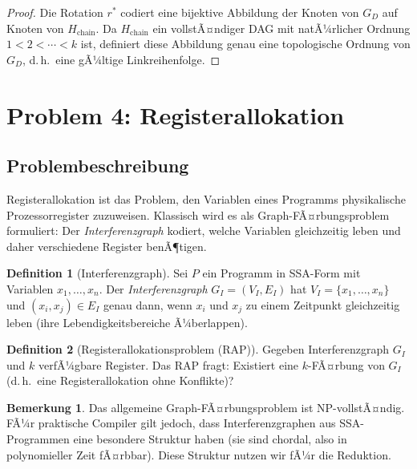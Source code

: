 ﻿\documentclass[a4paper,12pt]{article}
\theoremstyle{definition}
\newtheorem{definition}{Definition}
\newtheorem{bemerkung}{Bemerkung}
\begin{document}
\begin{proof}
Die Rotation $r^*$ codiert eine bijektive Abbildung der Knoten von $G_D$ auf Knoten von $H_{\text{chain}}$. Da $H_{\text{chain}}$ ein vollstÃ¤ndiger DAG mit natÃ¼rlicher Ordnung $1 < 2 < \cdots < k$ ist, definiert diese Abbildung genau eine topologische Ordnung von $G_D$, d.\,h.\ eine gÃ¼ltige Linkreihenfolge.
\end{proof}

\section{Problem 4: Registerallokation}
\label{sec:reg}

\subsection{Problembeschreibung}

Registerallokation ist das Problem, den Variablen eines Programms physikalische Prozessorregister zuzuweisen. Klassisch wird es als Graph-FÃ¤rbungsproblem formuliert: Der \emph{Interferenzgraph} kodiert, welche Variablen gleichzeitig leben und daher verschiedene Register benÃ¶tigen.

\begin{definition}[Interferenzgraph]
\label{def:ig}
Sei $P$ ein Programm in SSA-Form mit Variablen $x_1, \ldots, x_n$. Der \emph{Interferenzgraph} $G_I = (V_I, E_I)$ hat $V_I = \{x_1, \ldots, x_n\}$ und $(x_i, x_j) \in E_I$ genau dann, wenn $x_i$ und $x_j$ zu einem Zeitpunkt gleichzeitig leben (ihre Lebendigkeitsbereiche Ã¼berlappen).
\end{definition}

\begin{definition}[Registerallokationsproblem (RAP)]
\label{def:rap}
Gegeben Interferenzgraph $G_I$ und $k$ verfÃ¼gbare Register. Das RAP fragt: Existiert eine $k$-FÃ¤rbung von $G_I$ (d.\,h.\ eine Registerallokation ohne Konflikte)?
\end{definition}

\begin{bemerkung}
Das allgemeine Graph-FÃ¤rbungsproblem ist NP-vollstÃ¤ndig. FÃ¼r praktische Compiler gilt jedoch, dass Interferenzgraphen aus SSA-Programmen eine besondere Struktur haben (sie sind chordal, also in polynomieller Zeit fÃ¤rbbar). Diese Struktur nutzen wir fÃ¼r die Reduktion.
\end{bemerkung}
\end{document}
